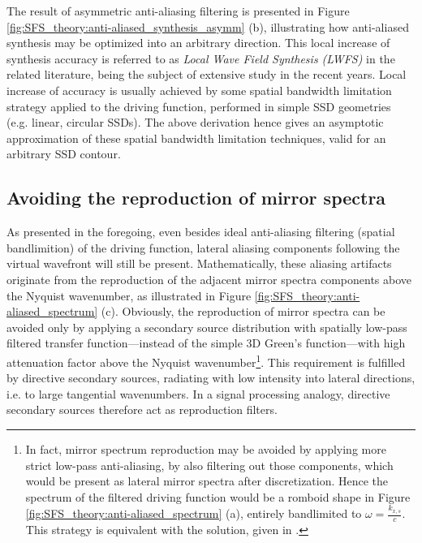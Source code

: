 The result of asymmetric anti-aliasing filtering is presented in Figure \ref{fig:SFS_theory:anti-aliased_synthesis_asymm} (b), illustrating how anti-aliased synthesis may be optimized into an arbitrary direction.
This local increase of synthesis accuracy is referred to as \emph{Local Wave Field Synthesis (LWFS)} in the related literature, being the subject of extensive study in the recent years. \cite{ahrens2010local, 5946329, spors2011local, Winter2016-TASL, Hahn17:EUSIPCO, Hahn16:AES, Winter15:EURONOISE, Winter15:AES}
Local increase of accuracy is usually achieved by some spatial bandwidth limitation strategy applied to the driving function, performed in simple SSD geometries (e.g. linear, circular SSDs).
The above derivation hence gives an asymptotic approximation of these spatial bandwidth limitation techniques, valid for an arbitrary SSD contour.

\subsection{Avoiding the reproduction of mirror spectra}

As presented in the foregoing, even besides ideal anti-aliasing filtering (spatial bandlimition) of the driving function, lateral aliasing components following the virtual wavefront will still be present.
Mathematically, these aliasing artifacts originate from the reproduction of the adjacent mirror spectra components above the Nyquist wavenumber, as illustrated in Figure \ref{fig:SFS_theory:anti-aliased_spectrum} (c).
Obviously, the reproduction of mirror spectra can be avoided only by applying a secondary source distribution with spatially low-pass filtered transfer function---instead of the simple 3D Green's function---with high attenuation factor above the Nyquist wavenumber\footnote{In fact, mirror spectrum reproduction may be avoided by applying more strict low-pass anti-aliasing, by also filtering out those components, which would be present as lateral mirror spectra after discretization. 
Hence the spectrum of the filtered driving function would be a romboid shape in Figure \ref{fig:SFS_theory:anti-aliased_spectrum} (a), entirely bandlimited to $\omega = \frac{k_{x,s}}{c}$.
This strategy is equivalent with the solution, given in \cite{Winter2018:GeometricModel}.}.
This requirement is fulfilled by directive secondary sources, radiating with low intensity into lateral directions, i.e. to large tangential wavenumbers.
In a signal processing analogy, directive secondary sources therefore act as reproduction filters.

